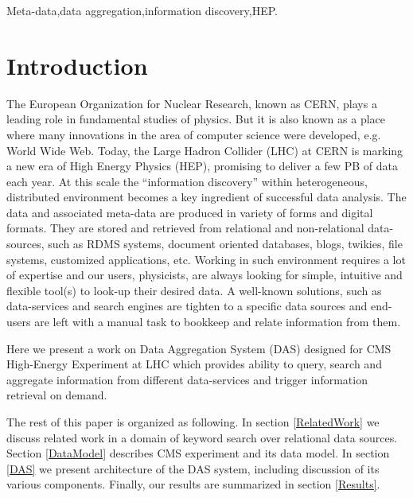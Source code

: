 \documentclass[1p,times]{elsarticle}
\begin{document}
\begin{frontmatter}
\begin{keyword}
Meta-data\sep data aggregation\sep information discovery\sep HEP.


\end{keyword}

\end{frontmatter}


\section{Introduction}
The European Organization for Nuclear Research, known as CERN, plays a leading
role in fundamental studies of physics. But it is also known as a place where
many innovations in the area of computer science were developed, e.g. World Wide Web.
Today, the Large Hadron Collider (LHC) at CERN is marking a new era of High Energy
Physics (HEP), promising to deliver a few PB of data each year. 
At this scale the ``information discovery'' within heterogeneous, distributed 
environment becomes a key ingredient of successful data analysis.
The data and associated meta-data are produced in variety of forms and digital formats.
They are stored and retrieved from relational and non-relational data-sources, such as 
RDMS systems, document oriented databases, blogs, twikies, file systems,
customized applications, etc. 
Working in such environment requires a lot of expertise and our users, physicists, 
are always looking for simple, intuitive and flexible
tool(s) to look-up their desired data. A well-known solutions, such as data-services
and search engines are tighten to a specific data sources and end-users are left 
with a manual task to bookkeep and relate information from them.

Here we present a work on Data Aggregation System (DAS) designed for
CMS High-Energy Experiment at LHC which provides
ability to query, search and aggregate information from different 
data-services and trigger information retrieval on demand.

The rest of this paper is organized as following. 
In section \ref{RelatedWork} we discuss related work in a domain of 
keyword search over relational data sources.
Section \ref{DataModel} describes CMS experiment and its data model. In section
\ref{DAS} we present architecture of the DAS system, including discussion of its
various components. Finally, our results are summarized in section \ref{Results}.
\end{document}
